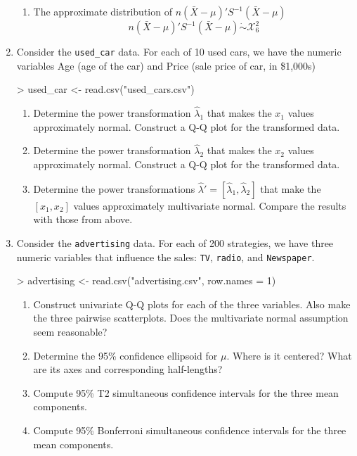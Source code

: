 \documentclass[12pt,a4paper]{paper}
\begin{document}
\begin{enumerate}
\begin{enumerate}
\item The approximate distribution of $n(\bar{X}-\mu)'S^{-1}(\bar{X} - \mu)$
\[n(\bar{X}-\mu)'S^{-1}(\bar{X} - \mu) \mathrel{\dot\sim} \mathcal{X}^{2}_{6}\]
\end{enumerate}
\item Consider the \texttt{used\_car} data. For each of 10 used cars, we have the numeric variables Age (age of the car) and Price (sale price of car, in \$1,000s)
\begin{Schunk}
\begin{Sinput}
> used_car <- read.csv("used_cars.csv")
\end{Sinput}
\end{Schunk}
\begin{enumerate}
\item Determine the power transformation $\hat{\lambda}_{1}$ that makes the $x_{1}$ values approximately normal. Construct a Q-Q plot for the transformed data.
\item Determine the power transformation $\hat{\lambda}_{2}$ that makes the $x_{2}$ values approximately normal. Construct a Q-Q plot for the transformed data.
\item Determine the power transformations $\hat{\lambda}' = \left[\hat{\lambda}_{1},\hat{\lambda}_{2}\right]$ that make the $\left[x_{1},x_{2}\right]$ values approximately multivariate normal. Compare the results with those from above.
\end{enumerate}
\item Consider the \texttt{advertising} data. For each of 200 strategies, we have three numeric variables that influence the sales: \texttt{TV}, \texttt{radio}, and \texttt{Newspaper}.
\begin{Schunk}
\begin{Sinput}
> advertising <- read.csv("advertising.csv", row.names = 1)
\end{Sinput}
\end{Schunk}
\begin{enumerate}
\item Construct univariate Q-Q plots for each of the three variables. Also make the three
pairwise scatterplots. Does the multivariate normal assumption seem reasonable?
\item Determine the 95\% confidence ellipsoid for $\mu$. Where is it centered? What are its axes and corresponding half-lengths?
\item Compute 95\% T2 simultaneous confidence intervals for the three mean components.
\item Compute 95\% Bonferroni simultaneous confidence intervals for the three mean components.

\end{enumerate}
\end{enumerate}
\end{document}
